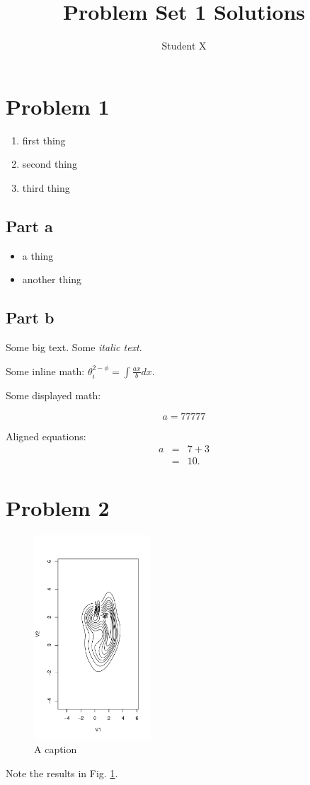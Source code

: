 \documentclass[12pt]{article}
\begin{document}
\title{Problem Set 1 Solutions}
\author{Student X}

\maketitle

\section{Problem 1}

\begin{enumerate}
\item first thing
\item second thing
\item third thing
\end{enumerate}

\subsection{Part a}

\begin{itemize}
\item a thing
\item another thing
\end{itemize}

\subsection{Part b}

Some {\large big text}.  Some {\it italic text}. 

Some inline math: $ \theta_{i}^{2-\phi} = \int \frac{ax}{b} dx $.

Some displayed math:

\[
a = 77777
\]

Aligned equations:
\begin{eqnarray*} 
a & = & 7 + 3 \\
  & = & 10.
\end{eqnarray*}

\section{Problem 2}

\begin{figure}
  \includegraphics[height=3in]{kdeFit.pdf}
  \caption{A caption}
  \label{fig:myfig}
\end{figure}

Note the results in Fig. \ref{fig:myfig}.
\end{document}
